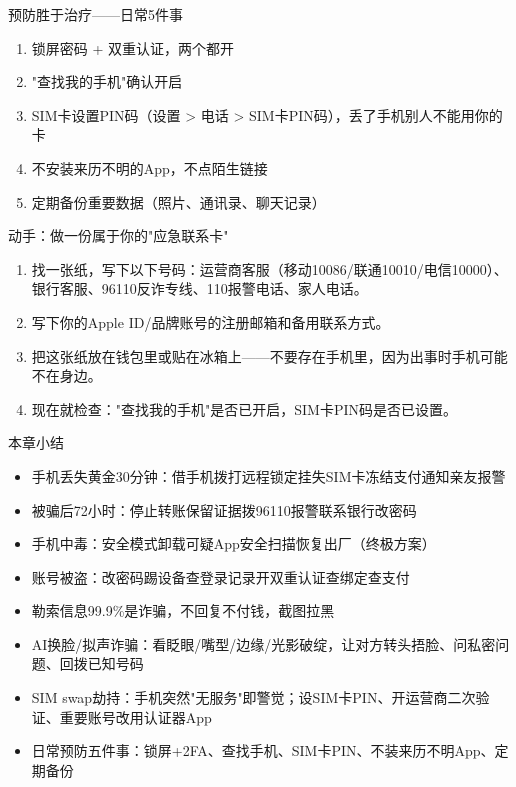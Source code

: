 \begin{tcbwarn}{预防胜于治疗——日常5件事}
\begin{enumerate}
  \item 锁屏密码 + 双重认证，两个都开
  \item "查找我的手机"确认开启
  \item SIM卡设置PIN码（设置 > 电话 > SIM卡PIN码），丢了手机别人不能用你的卡
  \item 不安装来历不明的App，不点陌生链接
  \item 定期备份重要数据（照片、通讯录、聊天记录）
\end{enumerate}

\end{tcbwarn}

\begin{tcbpractice}{动手：做一份属于你的"应急联系卡"}
\begin{enumerate}
  \item 找一张纸，写下以下号码：运营商客服（移动10086/联通10010/电信10000）、银行客服、96110反诈专线、110报警电话、家人电话。
  \item 写下你的Apple ID/品牌账号的注册邮箱和备用联系方式。
  \item 把这张纸放在钱包里或贴在冰箱上——不要存在手机里，因为出事时手机可能不在身边。
  \item 现在就检查："查找我的手机"是否已开启，SIM卡PIN码是否已设置。
\end{enumerate}

\end{tcbpractice}

\begin{tcbsummary}{本章小结}
\begin{itemize}
  \item 手机丢失黄金30分钟：借手机拨打远程锁定挂失SIM卡冻结支付通知亲友报警
  \item 被骗后72小时：停止转账保留证据拨96110报警联系银行改密码
  \item 手机中毒：安全模式卸载可疑App安全扫描恢复出厂（终极方案）
  \item 账号被盗：改密码踢设备查登录记录开双重认证查绑定查支付
  \item 勒索信息99.9\%是诈骗，不回复不付钱，截图拉黑
  \item AI换脸/拟声诈骗：看眨眼/嘴型/边缘/光影破绽，让对方转头捂脸、问私密问题、回拨已知号码
  \item SIM swap劫持：手机突然"无服务"即警觉；设SIM卡PIN、开运营商二次验证、重要账号改用认证器App
  \item 日常预防五件事：锁屏+2FA、查找手机、SIM卡PIN、不装来历不明App、定期备份
\end{itemize}

\end{tcbsummary}
